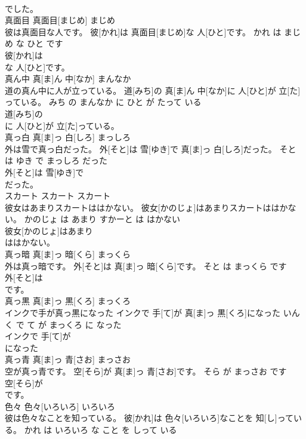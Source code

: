 \documentclass[8pt]{extreport}
\begin{document}
\begin{CJK}{UTF8}{min}
\\	でした。		
\\	真面目	真面目[まじめ]	まじめ	
\\	彼は真面目な人です。	彼[かれ]は 真面目[まじめ]な 人[ひと]です。	かれ は まじめ な ひと です	
\\	彼[かれ]は
\\	な 人[ひと]です。		
\\	真ん中	真[ま]ん 中[なか]	まんなか	
\\	道の真ん中に人が立っている。	道[みち]の 真[ま]ん 中[なか]に 人[ひと]が 立[た]っている。	みち の まんなか に ひと が たって いる	
\\	道[みち]の
\\	に 人[ひと]が 立[た]っている。		
\\	真っ白	真[ま]っ 白[しろ]	まっしろ	
\\	外は雪で真っ白だった。	外[そと]は 雪[ゆき]で 真[ま]っ 白[しろ]だった。	そと は ゆき で まっしろ だった	
\\	外[そと]は 雪[ゆき]で
\\	だった。		
\\	スカート	スカート	スカート	
\\	彼女はあまりスカートははかない。	彼女[かのじょ]はあまりスカートははかない。	かのじょ は あまり すかーと は はかない	
\\	彼女[かのじょ]はあまり
\\	ははかない。		
\\	真っ暗	真[ま]っ 暗[くら]	まっくら	
\\	外は真っ暗です。	外[そと]は 真[ま]っ 暗[くら]です。	そと は まっくら です	
\\	外[そと]は
\\	です。		
\\	真っ黒	真[ま]っ 黒[くろ]	まっくろ	
\\	インクで手が真っ黒になった	インクで 手[て]が 真[ま]っ 黒[くろ]になった	いんく で て が まっくろ に なった	
\\	インクで 手[て]が
\\	になった		
\\	真っ青	真[ま]っ 青[さお]	まっさお	
\\	空が真っ青です。	空[そら]が 真[ま]っ 青[さお]です。	そら が まっさお です	
\\	空[そら]が
\\	です。		
\\	色々	色々[いろいろ]	いろいろ	
\\	彼は色々なことを知っている。	彼[かれ]は 色々[いろいろ]なことを 知[し]っている。	かれ は いろいろ な こと を しって いる	

\end{CJK}
\end{document}
